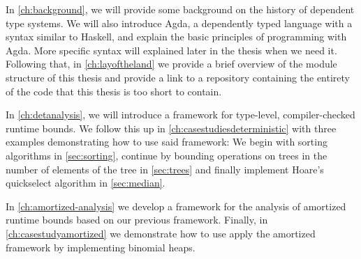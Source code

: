 In \autoref{ch:background}, we will provide some background on the history of dependent type systems. We will also introduce Agda, a dependently typed language with a syntax similar to Haskell, and explain the basic principles of programming with Agda. More specific syntax will explained later in the thesis when we need it. Following that, in \autoref{ch:layoftheland} we provide a brief overview of the module structure of this thesis and provide a link to a repository containing the entirety of the code that this thesis is too short to contain.

In \autoref{ch:detanalysis}, we will introduce a framework for type-level, compiler-checked runtime bounds. We follow this up in \autoref{ch:casestudiesdeterministic} with three examples demonstrating how to use said framework: We begin with sorting algorithms in \autoref{sec:sorting}, continue by bounding operations on trees in the number of elements of the tree in \autoref{sec:trees} and finally implement Hoare's quickselect algorithm in \autoref{sec:median}.

In \autoref{ch:amortized-analysis} we develop a framework for the analysis of amortized runtime bounds based on our previous framework. Finally, in \autoref{ch:casestudyamortized} we demonstrate how to use apply the amortized framework by implementing binomial heaps.